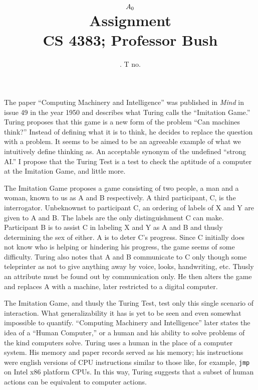 \documentclass[11pt]{article}
\title{
	$A_{0}$ \\
	{\large Assignment \ass\\
	CS 4383; Professor Bush}
}
\author{
	\name. T no. \tno
}
\begin{document}
\maketitle

The paper ``Computing Machinery and Intelligence'' was published in {\it Mind} in issue 49 in the year 1950 and describes what Turing calls the ``Imitation Game.'' Turing proposes that this game is a new form of the problem ``Can machines think?'' Instead of defining what it is to think, he decides to replace the question with a problem. It seems to be aimed to be an agreeable example of what we intuitively define thinking as. An acceptable synonym of the undefined ``strong AI.'' I propose that the Turing Test is a test to check the aptitude of a computer at the Imitation Game, and little more.

The Imitation Game proposes a game consisting of two people, a man and a woman, known to us as A and B respectively. A third participant, C, is the interrogator. Unbeknownst to participant C, an ordering of labels of X and Y are given to A and B. The labels are the only distinguishment C can make. Participant B is to assist C in labeling X and Y as A and B and thusly determining the sex of either. A is to deter C's progress. Since C initially does not know who is helping or hindering his progress, the game seems of some difficulty. Turing also notes that A and B communicate to C only though some teleprinter as not to give anything away by voice, looks, handwriting, etc. Thusly an attribute must be found out by communication only. He then alters the game and replaces A with a machine, later restricted to a digital computer.

The Imitation Game, and thusly the Turing Test, test only this single scenario of interaction. What generalizability it has is yet to be seen and even somewhat impossible to quantify. ``Computing Machinery and Intelligence'' later states the idea of a ``Human Computer,'' or a human and his ability to solve problems of the kind computers solve. Turing uses a human in the place of a computer system. His memory and paper records served as his memory; his instructions were english versions of CPU instructions similar to those like, for example, {\tt jmp} on Intel x86 platform CPUs. In this way, Turing suggests that a subset of human actions can be equivalent to computer actions.
\end{document}
